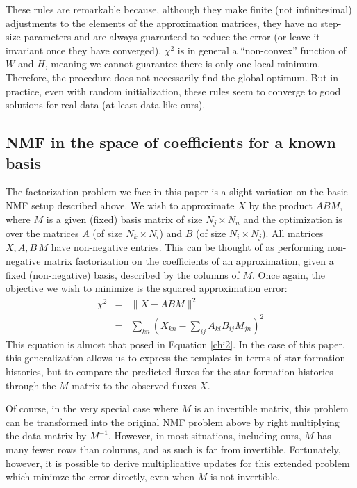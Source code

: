 \documentclass[10pt,preprint]{aastex}
\newcommand{\inv}{^{-1}}
\newcommand{\XX}{X}
\newcommand{\Xkn}{X_{kn}}
\renewcommand{\AA}{A}
\newcommand{\WW}{W}
\newcommand{\HH}{H}
\newcommand{\BB}{B}
\newcommand{\MM}{M}
\newcommand{\Aki}{A_{ki}}
\newcommand{\Bij}{B_{ij}}
\newcommand{\Mjn}{M_{jn}}
\begin{document}
These rules are remarkable because, although they make finite (not
infinitesimal) adjustments to the elements of the approximation
matrices, they have no step-size parameters and are always guaranteed
to reduce the error (or leave it invariant once they have converged).
$\chi^2$ is in general a ``non-convex'' function of $\WW$ and $\HH$,
meaning we cannot guarantee there is only one local
minimum. Therefore, the procedure does not necessarily find the global
optimum. But in practice, even with random initialization, these rules
seem to converge to good solutions for real data (at least data like
ours).

\subsection{NMF in the space of coefficients for a known basis}
The factorization problem we face in this paper is a slight variation on the
basic NMF setup described above. We wish to approximate $\XX$ by the
product $\AA\BB\MM$, 
where $\MM$ is a given (fixed) basis matrix of size $N_j \times N_n$
and the optimization is over the matrices $\AA$ (of size
$N_k\times N_i$) and $\BB$ (of size $N_i\times N_j$). All matrices
$\XX,\AA,\BB\,\MM$ have non-negative entries. This can be thought of
as performing non-negative matrix factorization on the coefficients of
an approximation, given a fixed (non-negative) basis, described by the
columns of $\MM$. Once again, the objective we wish to minimize is the
squared approximation error: 
\begin{eqnarray} 
\chi^2 &=& \|\XX-\AA\BB\MM\|^2\\
&=& \sum_{kn} \left(\Xkn - \sum_{ij} \Aki\Bij\Mjn \right)^2
\end{eqnarray}
This equation is almost that posed in Equation \ref{chi2}.
In the case of this paper, this generalization allows us to express
the templates in terms of star-formation histories, but to compare the
predicted fluxes for the star-formation histories through the $\MM$
matrix to the observed fluxes $\XX$.

Of course, in the very special case where $\MM$ is an invertible
matrix, this problem can be transformed into the original NMF problem above by
right multiplying the data matrix by $\MM\inv$. However, in most
situations, including ours, $\MM$ has many fewer rows than columns, and
as such is far from invertible. Fortunately, however, it is possible
to derive multiplicative updates for this extended problem 
which minimze the error directly, even when $\MM$ is not invertible.
\end{document}
